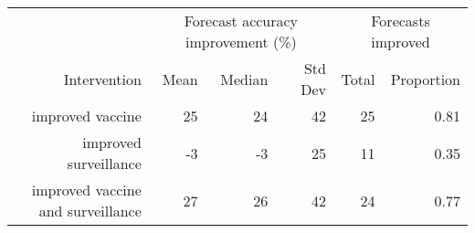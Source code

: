 
\begin{tabular*}{1.0\textwidth}{rrrrrr}
\toprule
             & \multicolumn{3}{c}{Forecast accuracy improvement (\%)} & \multicolumn{2}{c}{Forecasts improved} \\
Intervention & Mean & Median & Std Dev & Total & Proportion \\
\midrule

improved vaccine & 25 & 24 & 42 & 25 & 0.81 \\
improved surveillance & -3 & -3 & 25 & 11 & 0.35 \\
improved vaccine and surveillance & 27 & 26 & 42 & 24 & 0.77 \\

\bottomrule
\end{tabular*}

